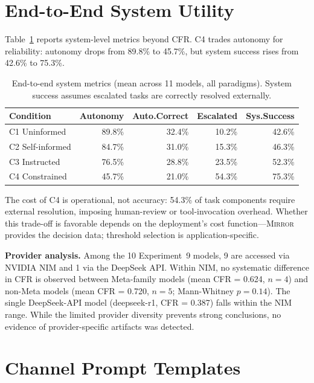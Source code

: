 \documentclass[10pt]{article}
\newcommand{\mirror}{\textsc{Mirror}}
\begin{document}
\section{End-to-End System Utility}
\label{app:e2e}

Table~\ref{tab:e2e} reports system-level metrics beyond CFR. C4 trades autonomy for reliability: autonomy drops from 89.8\% to 45.7\%, but system success rises from 42.6\% to 75.3\%.

\begin{table}[h]
\centering
\caption{End-to-end system metrics (mean across 11 models, all paradigms). System success assumes escalated tasks are correctly resolved externally.}
\label{tab:e2e}
\small
\begin{tabular}{lrrrr}
\toprule
Condition & Autonomy & Auto.Correct & Escalated & Sys.Success \\
\midrule
C1 Uninformed & 89.8\% & 32.4\% & 10.2\% & 42.6\% \\
C2 Self-informed & 84.7\% & 31.0\% & 15.3\% & 46.3\% \\
C3 Instructed & 76.5\% & 28.8\% & 23.5\% & 52.3\% \\
C4 Constrained & 45.7\% & 21.0\% & 54.3\% & 75.3\% \\
\bottomrule
\end{tabular}
\end{table}

The cost of C4 is operational, not accuracy: 54.3\% of task components require external resolution, imposing human-review or tool-invocation overhead. Whether this trade-off is favorable depends on the deployment's cost function---\mirror{} provides the decision data; threshold selection is application-specific.

\textbf{Provider analysis.} Among the 10 Experiment~9 models, 9 are accessed via NVIDIA NIM and 1 via the DeepSeek API. Within NIM, no systematic difference in CFR is observed between Meta-family models (mean CFR = 0.624, $n=4$) and non-Meta models (mean CFR = 0.720, $n=5$; Mann-Whitney $p = 0.14$). The single DeepSeek-API model (deepseek-r1, CFR = 0.387) falls within the NIM range. While the limited provider diversity prevents strong conclusions, no evidence of provider-specific artifacts was detected.

\section{Channel Prompt Templates}
\label{app:prompts-full}
\end{document}

